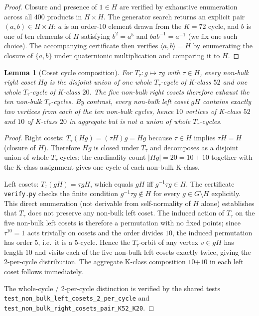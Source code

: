 \documentclass[11pt]{article}
\newtheorem{lemma}{Lemma}[section]
\begin{document}
\begin{proof}
Closure and presence of $1 \in H$ are verified by exhaustive enumeration
across all $400$ products in $H \times H$. The generator search returns
an explicit pair $(a, b) \in H \times H$: $a$ is an order-$10$ element
drawn from the $K = 72$ cycle, and $b$ is one of ten elements of $H$
satisfying $b^2 = a^5$ and $bab^{-1} = a^{-1}$ (we fix one such choice).
The accompanying certificate then verifies $\langle a, b \rangle = H$
by enumerating the closure of $\{a, b\}$ under quaternionic
multiplication and comparing it to $H$.
\end{proof}

\begin{lemma}[Coset cycle composition]\label{lem:cosetkpair}
For $T_\tau : g \mapsto \tau g$ with $\tau \in H$, every non-bulk
right coset $Hg$ is the disjoint union of one whole $T_\tau$-cycle of
K-class $52$ and one whole $T_\tau$-cycle of K-class $20$. The five
non-bulk right cosets therefore exhaust the ten non-bulk
$T_\tau$-cycles. By contrast, every non-bulk left coset $gH$ contains
exactly two vertices from each of the ten non-bulk cycles, hence
$10$ vertices of K-class $52$ and $10$ of K-class $20$ in aggregate
but is not a union of whole $T_\tau$-cycles.
\end{lemma}

\begin{proof}
Right cosets: $T_\tau(Hg) = (\tau H)g = Hg$ because $\tau \in H$
implies $\tau H = H$ (closure of $H$). Therefore $Hg$ is closed under
$T_\tau$ and decomposes as a disjoint union of whole $T_\tau$-cycles;
the cardinality count $|Hg| = 20 = 10 + 10$ together with the K-class
assignment gives one cycle of each non-bulk K-class.

Left cosets: $T_\tau(gH) = \tau g H$, which equals $gH$ iff
$g^{-1}\tau g \in H$. The certificate \texttt{verify.py} checks the
finite condition $g^{-1}\tau g \notin H$ for every $g \in G \setminus H$
explicitly. This direct enumeration (not derivable from
self-normality of $H$ alone) establishes that $T_\tau$ does not
preserve any non-bulk left coset. The induced action of $T_\tau$ on
the five non-bulk left cosets is therefore a permutation with no
fixed points; since $\tau^{10} = 1$ acts trivially on cosets and the
order divides $10$, the induced permutation has order $5$, i.e.\ it
is a $5$-cycle. Hence the $T_\tau$-orbit of any vertex
$v \in gH$ has length $10$ and visits each of the five non-bulk left
cosets exactly twice, giving the $2$-per-cycle distribution. The
aggregate K-class composition $10$+$10$ in each left coset follows
immediately.

The whole-cycle / 2-per-cycle distinction is verified by the shared
tests
\texttt{test\_non\_bulk\_left\_cosets\_2\_per\_cycle} and
\texttt{test\_non\_bulk\_right\_cosets\_pair\_K52\_K20}.
\end{proof}
\end{document}
